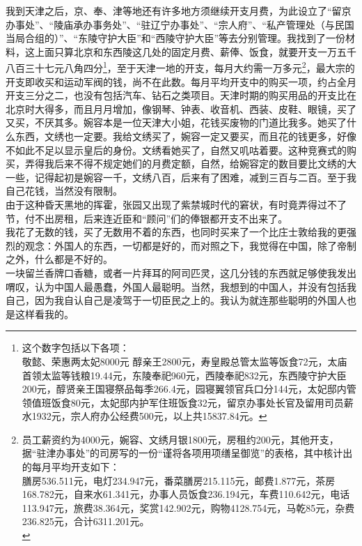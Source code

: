 我到天津之后，京、奉、津等地还有许多地方须继续开支月费，为此设立了“留京办事处”、“陵庙承办事务处”、“驻辽宁办事处”、“宗人府”、“私产管理处（与民国当局合组的）”、“东陵守护大臣”和“西陵守护大臣”等去分别管理。我找到了一份材料，这上面只算北京和东西陵这几处的固定月费、薪俸、饭食，就要开支一万五千八百三十七元八角四分\footnote{这个数字包括以下各项：\\
	敬懿、荣惠两太妃8000元  醇亲王2800元，寿皇殿总管太监等饭食72元，太庙首领太监等钱粮19.44元，东陵奉祀960元，西陵奉祀832元，东西陵守护大臣200元，醇贤亲王国寝祭品每季266.4元，园寝翼领官兵口分144元，太妃邸内管领值班饭食80元，太妃邸内护军住班饭食32元，留京办事处长官及留用司员薪水1932元，宗人府办公经费500元，以上共15837.84元。}，至于天津一地的开支，每月大约需一万多元\footnote{员工薪资约为4000元，婉容、文绣月银1800元，房租约200元，其他开支，据“驻津办事处”的司房写的一份“谨将各项用项缮呈御览”的表格，其中核计出的每月平均开支如下：\\
	膳房536.511元，电灯234.947元，番菜膳房215.115元，邮费1.877元，茶房168.782元，自来水61.341元，办事人员饭食236.194元，车费110.642元，电话113.947元，旅费38.364元，奖赏142.902元，购物4128.754元，马乾85元，杂费236.825元，合计6311.201元。\\}，最大宗的开支即收买和运动军阀的钱，尚不在此数。每月平均开支中的购买一项，约占全月开支三分之二，也没有包括汽车、钻石之类项目。天津时期的购买用品的开支比在北京时大得多，而且月月增加，像钢琴、钟表、收音机、西装、皮鞋、眼镜，买了又买，不厌其多。婉容本是一位天津大小姐，花钱买废物的门道比我多。她买了什么东西，文绣也一定要。我给文绣买了，婉容一定又要买，而且花的钱更多，好像不如此不足以显示皇后的身份。文绣看她买了，自然又叽咕着要。这种竞赛式的购买，弄得我后来不得不规定她们的月费定额，自然，给婉容定的数目要比文绣的大一些，记得起初是婉容一千，文绣八百，后来有了困难，减到三百与二百。至于我自己花钱，当然没有限制。\\

由于这种昏天黑地的挥霍，张园又出现了紫禁城时代的窘状，有时竟弄得过不了节，付不出房租，后来连近臣和“顾问”们的俸银都开支不出来了。\\

我花了无数的钱，买了无数用不着的东西，也同时买来了一个比庄士敦给我的更强烈的观念：外国人的东西，一切都是好的，而对照之下，我觉得在中国，除了帝制之外，什么都是不好的。\\

一块留兰香牌口香糖，或者一片拜耳的阿司匹灵，这几分钱的东西就足够使我发出喟叹，认为中国人最愚蠢，外国人最聪明。当然，我想到的中国人，并没有包括我自己，因为我自认自己是凌驾于一切臣民之上的。我认为就连那些聪明的外国人也是这样看我的。\\

